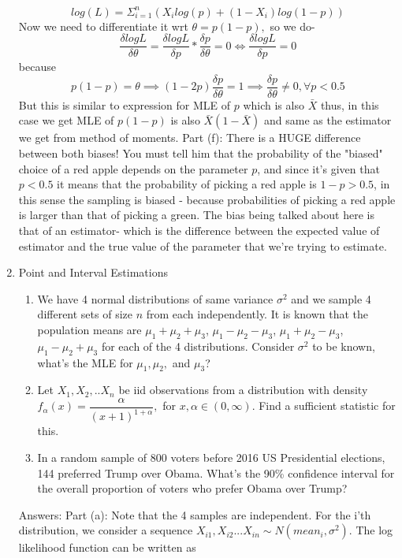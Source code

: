 \documentclass[12pt, oneside]{article}
\begin{document}
\begin{enumerate}
$$log(L) = \Sigma_{i=1}^{n} (X_i log(p) + (1-X_i) log(1-p))$$
Now we need to differentiate it wrt $\theta = p(1-p),$ so we do-
$$\dfrac{\delta log L}{\delta \theta} = \dfrac{\delta log L}{\delta p}*\dfrac{\delta p}{\delta \theta} = 0 \iff \dfrac{\delta log L}{\delta p} = 0$$ because
$$ p(1-p) = \theta \implies (1-2p)\dfrac{\delta p}{\delta \theta} = 1 \implies \dfrac{\delta p}{\delta \theta} \neq 0, \forall p <0.5$$
But this is similar to expression for MLE of $p$ which is also $\bar{X}$ thus, in this case we get MLE of $p(1-p)$ is also $\bar{X} (1-\bar{X})$ and same as the estimator we get from method of moments. 
Part (f): There is a HUGE difference between both biases! You must tell him that the probability of the "biased" choice of a red apple depends on the parameter $p$, and since it's given that $p<0.5$ it means that the probability of picking a red apple is $1-p > 0.5$, in this sense the sampling is biased - because probabilities of picking a red apple is larger than that of picking a green. The bias being talked about here is that of an estimator- which is the difference between the expected value of estimator and the true value of the parameter that we're trying to estimate. 

\item	Point and Interval Estimations
\begin{enumerate}
    \item We have 4 normal distributions of same variance $\sigma^2$ and we sample 4 different sets of size $n$ from each independently. It is known that the population means are $\mu_1 + \mu_2 + \mu_3$, $\mu_1 - \mu_2 - \mu_3$, $\mu_1 + \mu_2 - \mu_3$, $\mu_1 - \mu_2 + \mu_3$ for each of the 4 distributions. Consider $\sigma^2$ to be known, what's the MLE for $\mu_1,\mu_2,$ and $\mu_3$?

   \item Let $X_1, X_2,..X_n$ be iid observations from a distribution with density
    $f_{\alpha}(x) = \dfrac{\alpha}{(x+1)^{1+\alpha}},$ for $x, \alpha \in (0,\infty)$. Find a sufficient statistic for this.
    \item In a random sample of 800 voters before 2016 US Presidential elections, 144 preferred Trump over Obama. What's the 90\% confidence interval for the overall proportion of voters who prefer Obama over Trump?

\end{enumerate}
Answers:
\newline Part (a): Note that the 4 samples are independent. For the i'th distribution, we consider a sequence $X_{i1},X_{i2}...X_{in} \sim N(mean_i, \sigma^2)$. The log likelihood function can be written as


\end{enumerate}
\end{document}

